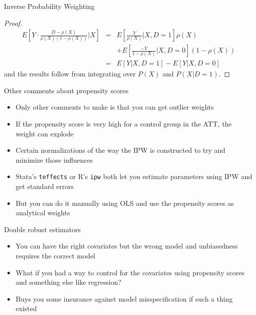 \documentclass{beamer}
\begin{document}
\begin{frame}{Inverse Probability Weighting}

	\begin{proof}
	\begin{eqnarray*}
	E \left[ Y \cdot \frac{D-\rho(X)}{\rho(X)(1-\rho(X))} \Big\vert X \right] &=& E \left[ \frac{Y}{\rho(X)} \Big\vert X,D=1 \right] \rho(X) \\
	&& + E\left[ \frac{-Y}{1-\rho(X)} \Big\vert X,D=0 \right](1-\rho(X)) \\
	&=& E[Y|X,D=1] - E[Y|X,D=0]
	\end{eqnarray*}and the results follow from integrating over $P(X)$ and $P(X|D=1)$.
	\end{proof}

\end{frame}

\begin{frame}{Other comments about propensity scores}

\begin{itemize}

\item Only other comments to make is that you can get outlier weights
\item If the propensity score is very high for a control group in the ATT, the weight can explode
\item Certain normalizations of the way the IPW is constructed to try and minimize those influences
\item Stata's \texttt{teffects} or R's \texttt{ipw} both let you estimate parameters using IPW and get standard errors
\item But you can do it manually using OLS and use  the propensity scores as analytical weights

\end{itemize}

\end{frame}


\begin{frame}{Double robust estimators}

\begin{itemize}
\item You can have the right covariates but the wrong model and unbiasedness requires the correct model
\item What if you had a way to control for the covariates using propensity scores and something else like regression?
\item Buys you some insurance against model misspecification if such a thing existed
\end{itemize}

\end{frame}
\end{document}
